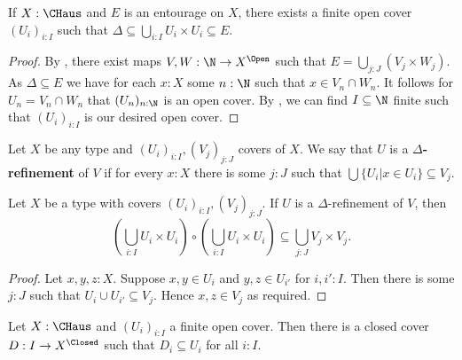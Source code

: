 \begin{lemma}\label{ReduceToFinite}
  If $X:\CHaus$ and $E$ is an entourage on $X$, there exists a finite open cover $(U_i)_{i:I}$ such that 
  $\Delta \subseteq \bigcup_{i:I} U_i \times U_i \subseteq E$. 
\end{lemma}
\begin{proof}
  By , there exist maps $V,W:\N \to X^\Open$ such that $E=\bigcup_{j:J} (V_j \times W_j)$. 
  As $\Delta \subseteq E$ we have for each $x:X$ some $n:\N$ such that $x\in V_n \cap W_n$. 
  It follows for $U_n = V_n \cap W_n$ that $(U_n)_{n:\N}$ is an open cover. 
  By , we can find $I\subseteq \N$ finite such that $(U_i)_{i:I}$ is our desired open cover. 
\end{proof}
\begin{definition}
  Let $X$ be any type and $(U_i)_{i:I},(V_j)_{j:J}$ covers of $X$. 
  We say that $U$ is a \textbf{$\Delta$-refinement} of $V$ if for every $x:X$ there is some $j:J$ such that $\bigcup\{U_i | x \in U_i\} \subseteq V_j$. 
\end{definition}
\begin{lemma}\label{ReducesToDelta}
  Let $X$ be a type with covers $(U_i)_{i:I},(V_j)_{j:J}$. If $U$ is a $\Delta$-refinement of $V$, then 
  $$\left(\bigcup_{i:I} U_i \times U_i\right) \circ \left(\bigcup_{i:I} U_i \times U_i\right) \subseteq \bigcup_{j:J} V_j \times V_j.$$
\end{lemma}
\begin{proof}
  Let $x,y,z:X$. Suppose $x,y \in U_i$ and $y,z \in U_{i'}$ for $i,i':I$. Then there is some $j:J$ such that $U_i \cup U_{i'} \subseteq V_j$. Hence $x,z\in V_j$ as required. 
\end{proof}
\begin{lemma}\label{closedSubcover}
  Let $X:\CHaus$ and $(U_i)_{i:I}$ a finite open cover. Then there is a closed cover $D: I \to X^\Closed$ such that $D_i\subseteq U_i$ for all $i:I$. 
\end{lemma}
